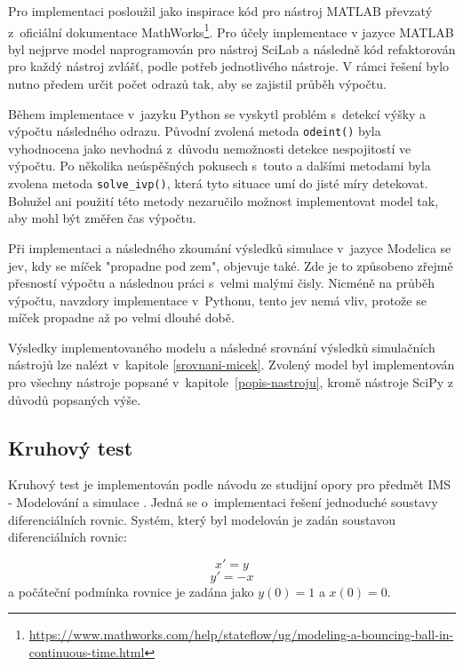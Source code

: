 Pro implementaci posloužil jako inspirace kód pro nástroj MATLAB převzatý z~oficiální dokumentace MathWorks\footnote{\url{https://www.mathworks.com/help/stateflow/ug/modeling-a-bouncing-ball-in-continuous-time.html}}. Pro účely implementace v jazyce MATLAB byl nejprve model naprogramován pro nástroj SciLab a následně kód refaktorován pro každý nástroj zvlášť, podle potřeb jednotlivého nástroje. V rámci řešení bylo nutno předem určit počet odrazů tak, aby se zajistil průběh výpočtu.

Během implementace v~jazyku Python se vyskytl problém s~detekcí výšky a výpočtu následného odrazu. Původní zvolená metoda \texttt{odeint()} byla vyhodnocena jako nevhodná z~důvodu nemožnosti detekce nespojitostí ve výpočtu. Po několika neúspěšných pokusech s~touto a dalšími metodami byla zvolena metoda \texttt{solve\_ivp()}, která tyto situace umí do jisté míry detekovat.  Bohužel ani použití této metody nezaručilo možnost implementovat model tak, aby mohl být změřen čas výpočtu.

Při implementaci a následného zkoumání výsledků simulace v~jazyce Modelica se jev, kdy se míček "propadne pod zem", objevuje také. Zde je to způsobeno zřejmě přesností výpočtu a následnou práci s~velmi malými čisly. Nicméně na průběh výpočtu, navzdory implementace v~Pythonu, tento jev nemá vliv, protože se míček propadne až po velmi dlouhé době.

Výsledky implementovaného modelu a následné srovnání výsledků simulačních nástrojů lze nalézt v~kapitole \ref{srovnani-micek}.
Zvolený model byl implementován pro všechny nástroje popsané v~kapitole~\ref{popis-nastroju}, kromě nástroje SciPy z důvodů popsaných výše.

\subsection*{Kruhový test}
\label{kruhovy-test}

Kruhový test je implementován podle návodu ze studijní opory pro předmět IMS - Modelování a simulace \cite{IMS-skripta}. Jedná se o~implementaci řešení jednoduché soustavy diferenciálních rovnic. Systém, který byl modelován je zadán soustavou diferenciálních rovnic:

\begin{equation}
   x' = y
\end{equation}
\begin{equation}
    y' = -x
\end{equation}
a počáteční podmínka rovnice je zadána jako $y(0) = 1$ a $x(0) = 0$.

